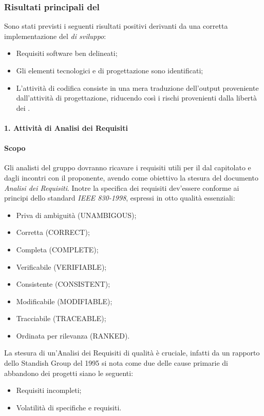         \subsubsection{Risultati principali del }
        Sono stati previsti i seguenti risultati positivi derivanti da una corretta implementazione del \textit{ di sviluppo}:
        \begin{itemize}
          \item Requisiti software ben delineati;
          \item Gli elementi tecnologici e di progettazione sono identificati;
          \item L'attivit\`a di codifica consiste in una mera traduzione dell'output proveniente dall'attivit\`a di progettazione,
            riducendo cos\`i i rischi provenienti dalla libert\`a dei .
        \end{itemize}
        
		\paragraph*{1. Attività di Analisi dei Requisiti}
			\paragraph*{Scopo}
				Gli analisti del gruppo dovranno ricavare i requisiti utili per il 
				dal capitolato e dagli incontri con il proponente, avendo come obiettivo la
				stesura del documento \textit{Analisi dei Requisiti}.
			        Inotre la specifica dei requisiti dev'essere conforme ai principi dello standard \textit{IEEE 830-1998}, espressi in otto qualit\`a
			        essenziali:
				\begin{itemize}
				\item Priva di ambiguit\`a (UNAMBIGOUS);
				\item Corretta (CORRECT);
				\item Completa (COMPLETE);
				\item Verificabile (VERIFIABLE);
				\item Consistente (CONSISTENT);
				\item Modificabile (MODIFIABLE);
				\item Tracciabile (TRACEABLE);
				\item Ordinata per rilevanza (RANKED).
				\end{itemize}
			        La stesura di un'Analisi dei Requisiti di qualit\`a \`e cruciale, infatti
			        da un rapporto dello Standish Group del 1995 si nota come due delle cause primarie
			        di abbandono dei progetti siano le seguenti:
				\begin{itemize}
				\item Requisiti incompleti;
				\item Volatilità di specifiche e requisiti.
				\end{itemize}
			
